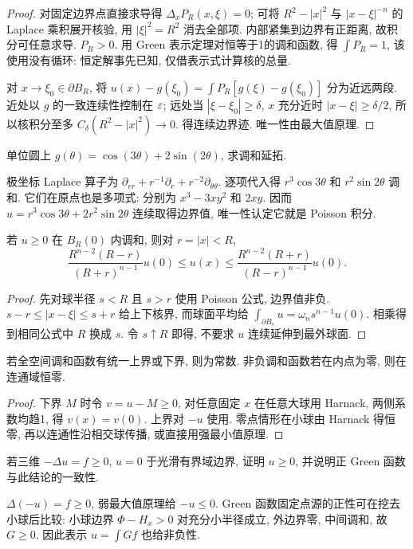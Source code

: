 \begin{proof}
对固定边界点直接求导得 $\Delta_xP_R(x,\xi)=0$; 可将 $R^2-|x|^2$ 与 $|x-\xi|^{-n}$ 的 Laplace 乘积展开核验, 用 $|\xi|^2=R^2$ 消去全部项. 内部紧集到边界有正距离, 故积分可任意求导. $P_R>0$. 用 Green 表示定理对恒等于1的调和函数, 得 $\int P_R=1$, 该使用没有循环: 恒定解事先已知, 仅借表示式计算核的总量.

对 $x\to\xi_0\in\partial B_R$, 将 $u(x)-g(\xi_0)=\int P_R[g(\xi)-g(\xi_0)]$ 分为近远两段. 近处以 $g$ 的一致连续性控制在 $\varepsilon$; 远处当 $|\xi-\xi_0|\ge\delta$, $x$ 充分近时 $|x-\xi|\ge\delta/2$, 所以核积分至多 $C_\delta(R^2-|x|^2)\to0$. 得连续边界迹. 唯一性由最大值原理.
\end{proof}
\begin{example}
单位圆上 $g(\theta)=\cos(3\theta)+2\sin(2\theta)$, 求调和延拓.
\end{example}
\begin{solution}
极坐标 Laplace 算子为 $\partial_{rr}+r^{-1}\partial_r+r^{-2}\partial_{\theta\theta}$. 逐项代入得 $r^3\cos3\theta$ 和 $r^2\sin2\theta$ 调和. 它们在原点也是多项式: 分别为 $x^3-3xy^2$ 和 $2xy$. 因而 $u=r^3\cos3\theta+2r^2\sin2\theta$ 连续取得边界值, 唯一性认定它就是 Poisson 积分.
\end{solution}
\begin{theorem}\label{thm:harnack}
若 $u\ge0$ 在 $B_R(0)$ 内调和, 则对 $r=|x|<R$,
\[
\frac{R^{n-2}(R-r)}{(R+r)^{n-1}}u(0)
\le u(x)\le
\frac{R^{n-2}(R+r)}{(R-r)^{n-1}}u(0).
\]
\end{theorem}
\begin{proof}
先对球半径 $s<R$ 且 $s>r$ 使用 Poisson 公式, 边界值非负. $s-r\le|x-\xi|\le s+r$ 给上下核界, 而球面平均给 $\int_{\partial B_s}u=\omega_n s^{n-1}u(0)$. 相乘得到相同公式中 $R$ 换成 $s$. 令 $s\uparrow R$ 即得, 不要求 $u$ 连续延伸到最外球面.
\end{proof}
\begin{corollary}
若全空间调和函数有统一上界或下界, 则为常数. 非负调和函数若在内点为零, 则在连通域恒零.
\end{corollary}
\begin{proof}
下界 $M$ 时令 $v=u-M\ge0$, 对任意固定 $x$ 在任意大球用 Harnack, 两侧系数均趋1, 得 $v(x)=v(0)$. 上界对 $-u$ 使用. 零点情形在小球由 Harnack 得恒零, 再以连通性沿相交球传播, 或直接用强最小值原理.
\end{proof}
\begin{exercise}
若三维 $-\Delta u=f\ge0$, $u=0$ 于光滑有界域边界, 证明 $u\ge0$, 并说明正 Green 函数与此结论的一致性.
\end{exercise}
\begin{solution}
$\Delta(-u)=f\ge0$, 弱最大值原理给 $-u\le0$. Green 函数固定点源的正性可在挖去小球后比较: 小球边界 $\Phi-H_x>0$ 对充分小半径成立, 外边界零, 中间调和, 故 $G\ge0$. 因此表示 $u=\int Gf$ 也给非负性.
\end{solution}
